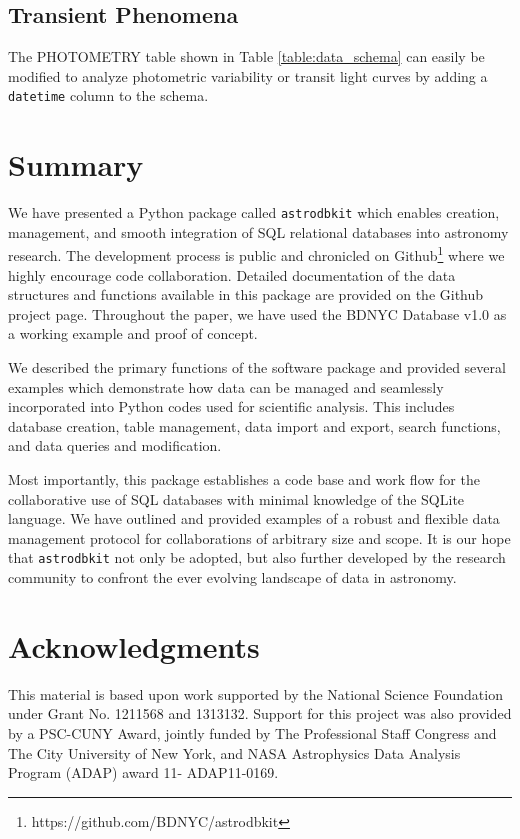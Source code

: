 \documentclass[iop,revtex4,natbib209]{emulateapj}
\begin{document}
\subsection{Transient Phenomena}
The PHOTOMETRY table shown in Table \ref{table:data_schema} can easily be modified to analyze photometric variability or transit light curves by adding a \texttt{datetime} column to the schema. 

\section{Summary}{\label{sec:summary}}
We have presented a Python package called \texttt{astrodbkit} which enables creation, management, and smooth integration of SQL relational databases into astronomy research. The development process is public and chronicled on Github\footnote{https://github.com/BDNYC/astrodbkit} where we highly encourage code collaboration. Detailed documentation of the data structures and functions available in this package are provided on the Github project page. Throughout the paper, we have used the BDNYC Database v1.0 as a working example and proof of concept.

We described the primary functions of the software package and provided several examples which demonstrate how data can be managed and seamlessly incorporated into Python codes used for scientific analysis. This includes database creation, table management, data import and export, search functions, and data queries and modification.

Most importantly, this package establishes a code base and work flow for the collaborative use of SQL databases with minimal knowledge of the SQLite language. We have outlined and provided examples of a robust and flexible data management protocol for collaborations of arbitrary size and scope. It is our hope that \texttt{astrodbkit} not only be adopted, but also further developed by the research community to confront the ever evolving landscape of data in astronomy.

\section*{Acknowledgments}
This material is based upon work supported by the National Science Foundation under Grant No. 1211568 and 1313132. Support for this project was also provided by a PSC-CUNY Award, jointly funded by The Professional Staff Congress and The City University of New York, and NASA Astrophysics Data Analysis Program (ADAP) award 11- ADAP11-0169.
\end{document}
